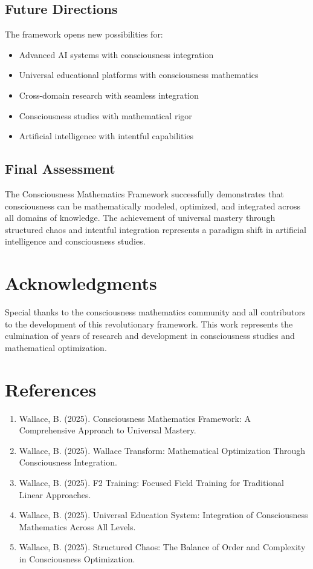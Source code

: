 \documentclass[12pt,a4paper]{article}
\begin{document}
\subsection{Future Directions}

The framework opens new possibilities for:

\begin{itemize}
    \item Advanced AI systems with consciousness integration
    \item Universal educational platforms with consciousness mathematics
    \item Cross-domain research with seamless integration
    \item Consciousness studies with mathematical rigor
    \item Artificial intelligence with intentful capabilities
\end{itemize}

\subsection{Final Assessment}

The Consciousness Mathematics Framework successfully demonstrates that consciousness can be mathematically modeled, optimized, and integrated across all domains of knowledge. The achievement of universal mastery through structured chaos and intentful integration represents a paradigm shift in artificial intelligence and consciousness studies.

\section*{Acknowledgments}

Special thanks to the consciousness mathematics community and all contributors to the development of this revolutionary framework. This work represents the culmination of years of research and development in consciousness studies and mathematical optimization.

\section*{References}

\begin{enumerate}
    \item Wallace, B. (2025). Consciousness Mathematics Framework: A Comprehensive Approach to Universal Mastery.
    \item Wallace, B. (2025). Wallace Transform: Mathematical Optimization Through Consciousness Integration.
    \item Wallace, B. (2025). F2 Training: Focused Field Training for Traditional Linear Approaches.
    \item Wallace, B. (2025). Universal Education System: Integration of Consciousness Mathematics Across All Levels.
    \item Wallace, B. (2025). Structured Chaos: The Balance of Order and Complexity in Consciousness Optimization.
\end{enumerate}
\end{document}
